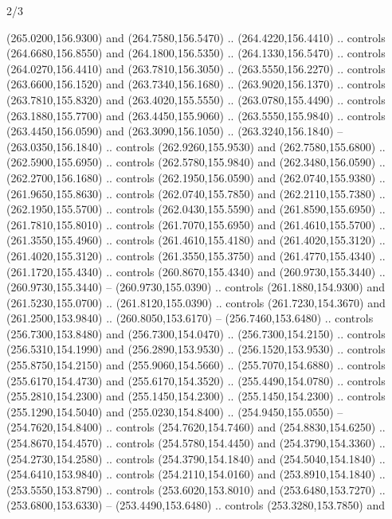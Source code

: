 \begin{flagdescription}{2/3}
\begin{scope}[xshift=0.5\flaglength,yshift=0.5\flagwidth,scale=\flagwidth/259.2]
\begin{scope}[y=0.8pt, x=0.8pt, yscale=-1,shift={(-243,-162)}]
      (265.0200,156.9300) and (264.7580,156.5470) .. (264.4220,156.4410) .. controls
      (264.6680,156.8550) and (264.1800,156.5350) .. (264.1330,156.5470) .. controls
      (264.0270,156.4410) and (263.7810,156.3050) .. (263.5550,156.2270) .. controls
      (263.6600,156.1520) and (263.7340,156.1680) .. (263.9020,156.1370) .. controls
      (263.7810,155.8320) and (263.4020,155.5550) .. (263.0780,155.4490) .. controls
      (263.1880,155.7700) and (263.4450,155.9060) .. (263.5550,155.9840) .. controls
      (263.4450,156.0590) and (263.3090,156.1050) .. (263.3240,156.1840) --
      (263.0350,156.1840) .. controls (262.9260,155.9530) and (262.7580,155.6800) ..
      (262.5900,155.6950) .. controls (262.5780,155.9840) and (262.3480,156.0590) ..
      (262.2700,156.1680) .. controls (262.1950,156.0590) and (262.0740,155.9380) ..
      (261.9650,155.8630) .. controls (262.0740,155.7850) and (262.2110,155.7380) ..
      (262.1950,155.5700) .. controls (262.0430,155.5590) and (261.8590,155.6950) ..
      (261.7810,155.8010) .. controls (261.7070,155.6950) and (261.4610,155.5700) ..
      (261.3550,155.4960) .. controls (261.4610,155.4180) and (261.4020,155.3120) ..
      (261.4020,155.3120) .. controls (261.3550,155.3750) and (261.4770,155.4340) ..
      (261.1720,155.4340) .. controls (260.8670,155.4340) and (260.9730,155.3440) ..
      (260.9730,155.3440) -- (260.9730,155.0390) .. controls (261.1880,154.9300) and
      (261.5230,155.0700) .. (261.8120,155.0390) .. controls (261.7230,154.3670) and
      (261.2500,153.9840) .. (260.8050,153.6170) -- (256.7460,153.6480) .. controls
      (256.7300,153.8480) and (256.7300,154.0470) .. (256.7300,154.2150) .. controls
      (256.5310,154.1990) and (256.2890,153.9530) .. (256.1520,153.9530) .. controls
      (255.8750,154.2150) and (255.9060,154.5660) .. (255.7070,154.6880) .. controls
      (255.6170,154.4730) and (255.6170,154.3520) .. (255.4490,154.0780) .. controls
      (255.2810,154.2300) and (255.1450,154.2300) .. (255.1450,154.2300) .. controls
      (255.1290,154.5040) and (255.0230,154.8400) .. (254.9450,155.0550) --
      (254.7620,154.8400) .. controls (254.7620,154.7460) and (254.8830,154.6250) ..
      (254.8670,154.4570) .. controls (254.5780,154.4450) and (254.3790,154.3360) ..
      (254.2730,154.2580) .. controls (254.3790,154.1840) and (254.5040,154.1840) ..
      (254.6410,153.9840) .. controls (254.2110,154.0160) and (253.8910,154.1840) ..
      (253.5550,153.8790) .. controls (253.6020,153.8010) and (253.6480,153.7270) ..
      (253.6800,153.6330) -- (253.4490,153.6480) .. controls (253.3280,153.7850) and

\end{scope}
\end{scope}
\end{flagdescription}

